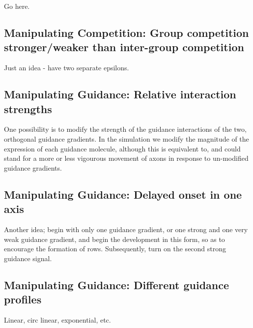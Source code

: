 \documentclass[a4paper,11pt]{article}
\newcommand{\mb}[1]{\mathbf{#1}}
\begin{document}
Go here.

\subsection*{Manipulating Competition: Group competition stronger/weaker than inter-group competition}

Just an idea - have two separate epsilons.

\subsection*{Manipulating Guidance: Relative interaction strengths}

One possibility is to modify the strength of the guidance interactions of the
two, orthogonal guidance gradients. In the simulation we modify the magnitude
of the expression of each guidance molecule, although this is equivalent to,
and could stand for a more or less vigourous movement of axons in response to
un-modified guidance gradients.

\subsection*{Manipulating Guidance: Delayed onset in one axis}

Another idea; begin with only one guidance gradient, or one strong and
one very weak guidance gradient, and begin the development in this
form, so as to encourage the formation of rows. Subsequently, turn on
the second strong guidance signal.

\subsection*{Manipulating Guidance: Different guidance profiles}

Linear, circ linear, exponential, etc.




\end{document}
